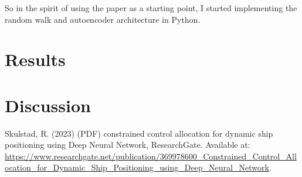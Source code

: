 \documentclass{article}
\begin{document}
So in the spirit of using the paper as a starting point, I started implementing the random walk and autoencoder architecture in Python. 

\section{Results}

\section{Discussion}

\begin{thebibliography}{99}
     Skulstad, R. (2023) (PDF) constrained control allocation for dynamic ship positioning using Deep Neural Network, ResearchGate. Available at: \url{https://www.researchgate.net/publication/369978600\_Constrained\_Control\_Allocation\_for\_Dynamic\_Ship\_Positioning\_using\_Deep\_Neural\_Network}. 
\end{thebibliography}
\end{document}
